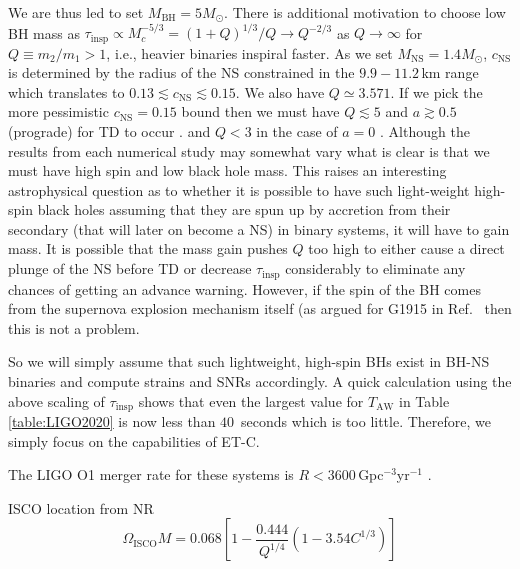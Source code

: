 \documentclass[amsmath,amssymb,aps,floats,amsfonts,notitlepage,superscriptaddress,eqsecnum,nofootinbib,10pt]{revtex4-1}
\newcommand{\f}{\frac}
\newcommand{\be}{\begin{equation}}
\newcommand{\ee}{\end{equation}}
\begin{document}
%
We are thus led to set $M_\text{BH} =5 M_\odot$. There is additional motivation to choose low BH mass as 
 $\tau_\text{insp} \propto M_c^{-5/3} = (1+Q)^{1/3}/Q\to Q^{-2/3}$ as $Q\to\infty$ for $Q\equiv m_2/m_1 > 1$, i.e., heavier binaries inspiral faster.
 As we set $M_\text{NS}=1.4 M_\odot$, $c_\text{NS}$ is determined by the radius of the NS constrained in the $9.9 - 11.2\,$km range \cite{Ozel:2016oaf}
 which translates to $0.13\lesssim c_\text{NS} \lesssim 0.15$. We also have $Q  \simeq 3.571$.
If we pick the more pessimistic $c_\text{NS} = 0.15$ bound then we must have $Q\lesssim 5$ and $a\gtrsim 0.5$ (prograde) for TD to occur \cite{Ferrari:2008nr}.
and $Q< 3$ in the case of $a=0$ \cite{Kyutoku:2011vz}.
Although the results from each numerical study may somewhat vary what is clear is that we must have high spin and low black hole mass.
This raises an interesting astrophysical question as to whether it is possible to have such light-weight high-spin black holes assuming that
they are spun up by accretion from their secondary (that will later on become a NS) in binary systems, it will have to gain mass.
It is possible that the mass gain pushes $Q$ too high to either cause a direct plunge of the NS before TD or decrease $\tau_\text{insp}$ considerably
to eliminate any chances of getting an advance warning.
However, if the spin of the BH comes from the supernova explosion mechanism itself (as argued for G1915 in Ref.~\cite{McClintock:2006xd} then this is not a problem. 

So we will simply assume that such lightweight, high-spin BHs exist in BH-NS binaries and compute strains and SNRs accordingly.
A quick calculation using the above scaling of $\tau_\text{insp}$ shows that even the largest value for $T_\text{AW}$ in Table \ref{table:LIGO2020}
is now less than $ 40\,$ seconds which is too little. Therefore, we simply focus on the capabilities of ET-C.


The LIGO O1 merger rate for these systems is $ R < 3600\,$Gpc$^{-3}$yr$^{-1}$ \cite{Abbott:2016ymx}.
%


ISCO location from NR 
\be
\Omega_\text{ISCO} M = 0.068 \left[ 1- \f{0.444}{Q^{1/4}}(1-3.54 C^{1/3})\right] 
\ee


 
 
 
 

%


 
 
 
 
 
 
 
\end{document}
